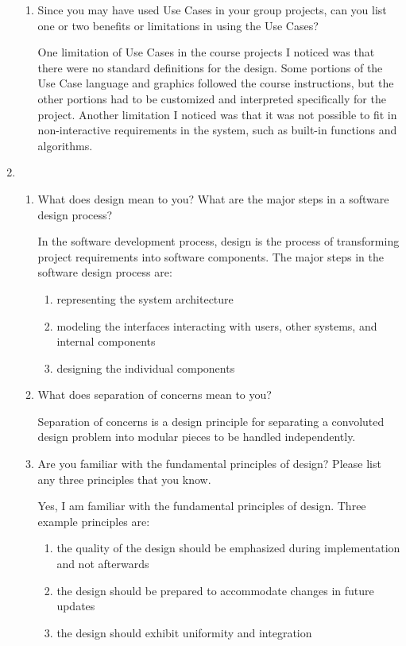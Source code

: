 \documentclass[12pt]{article}
\begin{document}
\begin{enumerate}
\begin{enumerate}[start=1,align=left]
      \item Since you may have used Use Cases in your group projects, can you list one or two benefits or limitations in using the Use Cases?

      One limitation of Use Cases in the course projects I noticed was that there were no standard definitions for the design. Some portions of the Use Case language and graphics followed the course instructions, but the other portions had to be customized and interpreted specifically for the project. Another limitation I noticed was that it was not possible to fit in non-interactive requirements in the system, such as built-in functions and algorithms.

    \end{enumerate}

    \item
    \begin{enumerate}[start=1,align=left]

      \item What does design mean to you? What are the major steps in a software design process?

      In the software development process, design is the process of transforming project requirements into software components. The major steps in the software design process are:
      \begin{enumerate}
        \item representing the system architecture
        \item modeling the interfaces interacting with users, other systems, and internal components
        \item designing the individual components
      \end{enumerate}

      \item What does separation of concerns mean to you?

      Separation of concerns is a design principle for separating a convoluted design problem into modular pieces to be handled independently.

      \item Are you familiar with the fundamental principles of design? Please list any three principles that you know.

      Yes, I am familiar with the fundamental principles of design. Three example principles are:
      \begin{enumerate}
        \item the quality of the design should be emphasized during implementation and not afterwards
        \item the design should be prepared to accommodate changes in future updates
        \item the design should exhibit uniformity and integration
      \end{enumerate}


\end{enumerate}
\end{enumerate}
\end{document}
